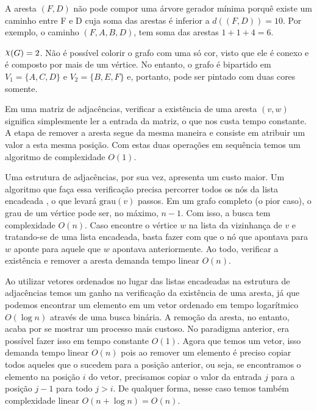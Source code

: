 \documentclass{homework}
\begin{document}
	\subsubquest A aresta $(F, D)$ não pode compor uma árvore gerador mínima porquê existe um caminho entre F e D cuja soma das arestas é inferior a $d((F, D)) = 10$. Por exemplo, o caminho $(F, A, B, D)$, tem soma das arestas $1 + 1 + 4 = 6$.
	
	\subsubquest $\rchi(G) = 2$. Não é possível colorir o grafo com uma só cor, visto que ele é conexo e é composto por mais de um vértice. No entanto, o grafo é bipartido em $V_1 = \{A, C, D\}$ e $V_2 = \{B, E, F\}$ e, portanto, pode ser pintado com duas cores somente.
	
	\quest
	
	\subsubquest Em uma matriz de adjacências, verificar a existência de uma aresta $(v, w)$ significa simplesmente ler a entrada  da matriz, o que nos custa tempo constante. A etapa de remover a aresta segue da mesma maneira e consiste em atribuir um valor a esta mesma posição. Com estas duas operações em sequência temos um algoritmo de complexidade $O(1)$.\par
	
	Uma estrutura de adjacências, por sua vez, apresenta um custo maior. Um algoritmo que faça essa verificação precisa percorrer todos os nós da lista encadeada , o que levará $\text{grau}(v)$ passos. Em um grafo completo (o pior caso), o grau de um vértice pode ser, no máximo, $n - 1$. Com isso, a busca tem complexidade $O(n)$. Caso encontre o vértice $w$ na lista da vizinhança de $v$ e tratando-se de uma lista encadeada, basta fazer com que o nó que apontava para $w$ aponte para aquele que $w$ apontava anteriormente. Ao todo, verificar a existência e remover a aresta demanda tempo linear $O(n)$.\par
	
	\subsubquest Ao utilizar vetores ordenados no lugar das listas encadeadas na estrutura de adjacências temos um ganho na verificação da existência de uma aresta, já que podemos encontrar um elemento em um vetor ordenado em tempo logarítmico $O(\log n)$ através de uma busca binária. A remoção da aresta, no entanto, acaba por se mostrar um processo mais custoso. No paradigma anterior, era possível fazer isso em tempo constante $O(1)$. Agora que temos um vetor, isso demanda tempo linear $O(n)$ pois ao remover um elemento é preciso copiar todos aqueles que o sucedem para a posição anterior, ou seja, se encontramos o elemento na posição $i$ do vetor, precisamos copiar o valor da entrada $j$ para a posição $j - 1$ para todo $j > i$. De qualquer forma, nesse caso temos também complexidade linear $O(n + \log n) = O(n)$.
	
\end{document}
